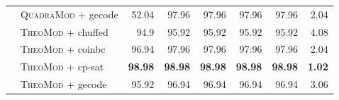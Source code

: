 \documentclass{book}
\begin{document}
\begin{table}[]
\begin{tabular}{@{}ll rr rr rr@{}}
& \textsc{QuadraMod} + gecode   & 52.04 & 97.96 & 97.96 & 97.96 & 97.96 & 2.04 \\
& \textsc{TheoMod} + chuffed   & 94.9 & 95.92 & 95.92 & 95.92 & 95.92 & 4.08 \\
& \textsc{TheoMod} + coinbc   & 96.94 & 97.96 & 97.96 & 97.96 & 97.96 & 2.04 \\
& \textsc{TheoMod} + cp-sat   & \bf 98.98 & \bf 98.98 & \bf 98.98 & \bf 98.98 & \bf 98.98 &  \bf 1.02 \\
& \textsc{TheoMod} + gecode   & 95.92 & 96.94 & 96.94 & 96.94 & 96.94 & 3.06 \\
\bottomrule\end{tabular} 

\end{table} 



\newpage
\end{document}
